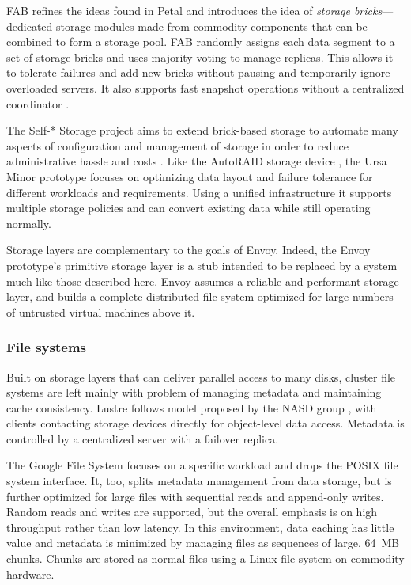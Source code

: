 FAB \cite{frolund,saito04} refines the ideas found in Petal and introduces the idea of \emph{storage bricks}---dedicated storage modules made from commodity components that can be combined to form a storage pool. FAB randomly assigns each data segment to a set of storage bricks and uses majority voting to manage replicas. This allows it to tolerate failures and add new bricks without pausing and temporarily ignore overloaded servers. It also supports fast snapshot operations without a centralized coordinator \cite{ji}.

The Self-* Storage project aims to extend brick-based storage to automate many aspects of configuration and management of storage in order to reduce administrative hassle and costs \cite{ganger03}. Like the AutoRAID storage device \cite{wilkes95}, the Ursa Minor prototype \cite{abd-el-malek} focuses on optimizing data layout and failure tolerance for different workloads and requirements. Using a unified infrastructure it supports multiple storage policies and can convert existing data while still operating normally.

Storage layers are complementary to the goals of Envoy. Indeed, the Envoy prototype's primitive storage layer is a stub intended to be replaced by a system much like those described here. Envoy assumes a reliable and performant storage layer, and builds a complete distributed file system optimized for large numbers of untrusted virtual machines above it.

\subsubsection{File systems}

Built on storage layers that can deliver parallel access to many disks, cluster file systems are left mainly with problem of managing metadata and maintaining cache consistency. Lustre \cite{lustre} follows model proposed by the NASD group \cite{gibson98a}, with clients contacting storage devices directly for object-level data access. Metadata is controlled by a centralized server with a failover replica.

The Google File System \cite{ghemawat} focuses on a specific workload and drops the POSIX file system interface. It, too, splits metadata management from data storage, but is further optimized for large files with sequential reads and append-only writes. Random reads and writes are supported, but the overall emphasis is on high throughput rather than low latency. In this environment, data caching has little value and metadata is minimized by managing files as sequences of large, 64~MB chunks. Chunks are stored as normal files using a Linux file system on commodity hardware.


